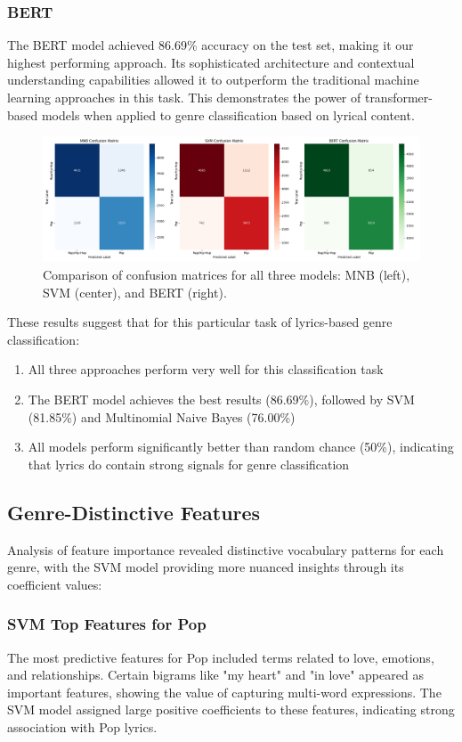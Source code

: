 \documentclass[conference]{IEEEtran}
\begin{document}
\subsubsection{BERT}
The BERT model achieved 86.69\% accuracy on the test set, making it our highest performing approach. Its sophisticated architecture and contextual understanding capabilities allowed it to outperform the traditional machine learning approaches in this task. This demonstrates the power of transformer-based models when applied to genre classification based on lyrical content.

\begin{figure}[htbp]
\centerline{\includegraphics[width=0.9\columnwidth]{plots/model_comparison_confusion.png}}
\caption{Comparison of confusion matrices for all three models: MNB (left), SVM (center), and BERT (right).}
\label{fig:comparison_confusion}
\end{figure}

These results suggest that for this particular task of lyrics-based genre classification:
\begin{enumerate}
\item All three approaches perform very well for this classification task
\item The BERT model achieves the best results (86.69\%), followed by SVM (81.85\%) and Multinomial Naive Bayes (76.00\%)
\item All models perform significantly better than random chance (50\%), indicating that lyrics do contain strong signals for genre classification
\end{enumerate}

\subsection{Genre-Distinctive Features}
Analysis of feature importance revealed distinctive vocabulary patterns for each genre, with the SVM model providing more nuanced insights through its coefficient values:

\subsubsection{SVM Top Features for Pop}
The most predictive features for Pop included terms related to love, emotions, and relationships. Certain bigrams like "my heart" and "in love" appeared as important features, showing the value of capturing multi-word expressions. The SVM model assigned large positive coefficients to these features, indicating strong association with Pop lyrics.
\end{document}
